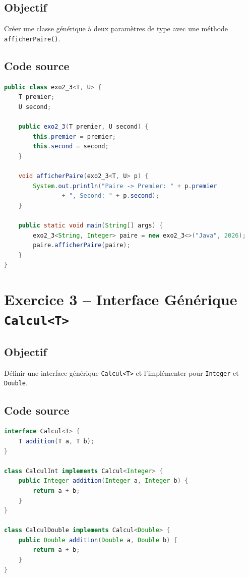 \subsection{Objectif}

Créer une classe générique à deux paramètres de type avec une méthode
\texttt{afficherPaire()}.

\subsection{Code source}

\begin{lstlisting}[language=Java, caption={exo2\_3.java -- Paire générique}]
public class exo2_3<T, U> {
    T premier;
    U second;

    public exo2_3(T premier, U second) {
        this.premier = premier;
        this.second = second;
    }

    void afficherPaire(exo2_3<T, U> p) {
        System.out.println("Paire -> Premier: " + p.premier
                + ", Second: " + p.second);
    }

    public static void main(String[] args) {
        exo2_3<String, Integer> paire = new exo2_3<>("Java", 2026);
        paire.afficherPaire(paire);
    }
}
\end{lstlisting}

\section{Exercice 3 -- Interface Générique \texttt{Calcul<T>}}

\subsection{Objectif}

Définir une interface générique \texttt{Calcul<T>} et l'implémenter pour
\texttt{Integer} et \texttt{Double}.

\subsection{Code source}

\begin{lstlisting}[language=Java, caption={exo3\_3.java -- Interface Calcul générique}]
interface Calcul<T> {
    T addition(T a, T b);
}

class CalculInt implements Calcul<Integer> {
    public Integer addition(Integer a, Integer b) {
        return a + b;
    }
}

class CalculDouble implements Calcul<Double> {
    public Double addition(Double a, Double b) {
        return a + b;
    }
}
\end{lstlisting}

